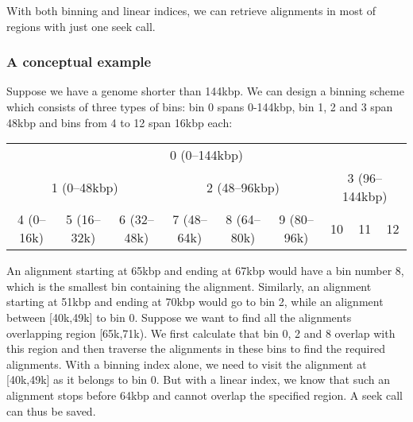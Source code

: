 \documentclass[10pt]{article}
\begin{document}
With both binning and linear indices, we can retrieve alignments in most
of regions with just one seek call.

\subsubsection{A conceptual example}
Suppose we have a genome shorter than 144kbp. We can design a binning
scheme which consists of three types of bins: bin 0 spans 0-144kbp, bin
1, 2 and 3 span 48kbp and bins from 4 to 12 span 16kbp each:

\begin{table}[ht]
  \centering
  {\small\begin{tabular}{|c|c|c|c|c|c|c|c|c|}
    \cline{1-9}
    \multicolumn{9}{|c|}{0 (0--144kbp)}\\\cline{1-9}
    \multicolumn{3}{|c|}{1 (0--48kbp)} & \multicolumn{3}{c|}{2 (48--96kbp)} & \multicolumn{3}{c|}{3 (96--144kbp)} \\\cline{1-9}
    4 (0--16k) & 5 (16--32k) & 6 (32--48k) & 7 (48--64k) & 8 (64--80k) & 9 (80--96k) & 10 & 11 & 12 \\
    \cline{1-9}
  \end{tabular}}
\end{table}

An alignment starting at 65kbp and ending at 67kbp would have a bin
number 8, which is the smallest bin containing the alignment. Similarly,
an alignment starting at 51kbp and ending at 70kbp would go to bin 2,
while an alignment between [40k,49k] to bin 0. Suppose we want to find
all the alignments overlapping region [65k,71k). We first calculate that
bin 0, 2 and 8 overlap with this region and then traverse the alignments
in these bins to find the required alignments. With a binning index
alone, we need to visit the alignment at [40k,49k] as it belongs to bin
0. But with a linear index, we know that such an alignment stops before
64kbp and cannot overlap the specified region. A seek call can thus be
saved.
\end{document}

